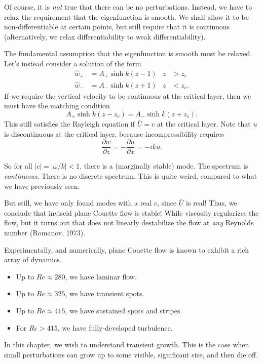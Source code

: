 \documentclass[a4paper]{article}
\begin{document}
Of course, it is \emph{not} true that there can be no perturbations. Instead, we have to relax the requirement that the eigenfunction is smooth. We shall allow it to be non-differentiable at certain points, but still require that it is continuous (alternatively, we relax differentiability to weak differentiability).

The fundamental assumption that the eigenfunction is smooth must be relaxed. Let's instead consider a solution of the form
\begin{align*}
  \hat{w}_+ &= A_+ \sinh k (z - 1) & z &> z_c\\
  \hat{w}_- &= A_- \sinh k(z + 1) & z &< z_c.
\end{align*}
If we require the vertical velocity to be continuous at the critical layer, then we must have the matching condition
\[
  A_+ \sinh k (z - z_c) = A_- \sinh k(z + z_c).
\]
This still satisfies the Rayleigh equation if $\bar{U} = c$ at the critical layer. Note that $u$ is discontinuous at the critical layer, because incompressibility requires
\[
  \frac{\partial w}{\partial z} = - \frac{\partial u}{\partial x} = -iku.
\]
\begin{center}
\end{center} %
So for all $|c| = |\omega/k| < 1$, there is a (marginally stable) mode. The spectrum is \emph{continuous}. There is no discrete spectrum. This is quite weird, compared to what we have previously seen.

But still, we have only found modes with a real $c$, since $\bar{U}$ is real! Thus, we conclude that inviscid plane Couette flow is stable! While viscosity regularizes the flow, but it turns out that does not linearly destabilize the flow at \emph{any} Reynolds number (Romanov, 1973).

Experimentally, and numerically, plane Couette flow is known to exhibit a rich array of dynamics.
\begin{itemize}
  \item Up to $Re \approx 280$, we have laminar flow.
  \item Up to $Re \approx 325$, we have transient spots.
  \item Up to $Re \approx 415$, we have sustained spots and stripes.
  \item For $Re > 415$, we have fully-developed turbulence.
\end{itemize}
In this chapter, we wish to understand transient growth. This is the case when small perturbations can grow up to some visible, significant size, and then die off.
\end{document}
